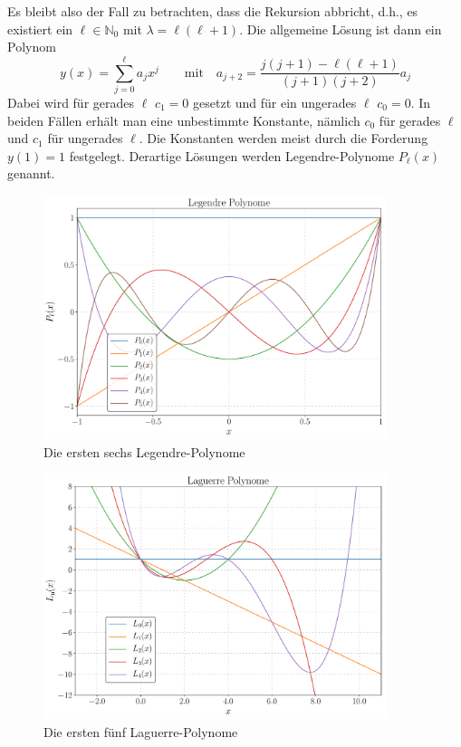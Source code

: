 \documentclass[9pt]{report}
\begin{document}
Es bleibt also der Fall zu betrachten, dass die Rekursion abbricht, d.h., es existiert ein $\ell\in\mathbb{N}_0$ mit $\lambda=\ell(\ell+1)$. Die allgemeine Lösung ist dann ein Polynom
\begin{equation}
y(x)=\sum_{j=0}^{\ell} a_{j}x^{j}\qquad\mathrm{mit}\quad a_{j+2}=\frac{j(j+1)-\ell(\ell+1)}{(j+1)(j+2)}a_{j}
\end{equation}
Dabei wird für gerades $\ell$ $c_1=0$ gesetzt und für ein ungerades $\ell$ $c_0=0$. In beiden Fällen erhält man eine unbestimmte Konstante, nämlich $c_0$ für gerades $\ell$ und $c_1$ für ungerades $\ell$. Die Konstanten werden meist durch die Forderung $y(1)=1$ festgelegt. Derartige Lösungen werden Legendre-Polynome $P_{\ell}(x)$ genannt.

\begin{figure}[h]
\centering
\includegraphics[width=10cm]{1-Legendre-Polynome.pdf}
\caption{Die ersten sechs Legendre-Polynome}
\end{figure}

\begin{figure}[h]
\centering
\includegraphics[width=10cm]{2-Laguerre-Polynome.pdf}
\caption{Die ersten fünf Laguerre-Polynome}
\end{figure}
\end{document}
